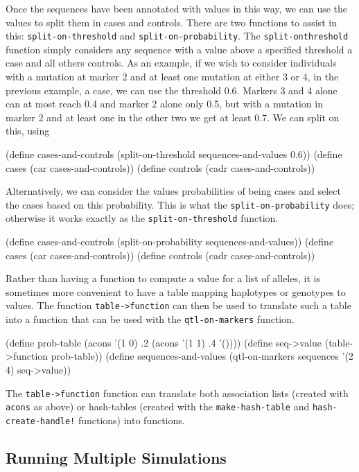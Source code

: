 \documentclass{manual}
\begin{document}
\begin{empfile}
Once the sequences have been annotated with values in this way, we can
use the values to split them in cases and controls.  There are two
functions to assist in this: \texttt{split-on-threshold} and
\texttt{split-on-probability}.  The \texttt{split-on\-threshold}
function simply considers any sequence with a value above a specified
threshold a case and all others controls.  As an example, if we wish
to consider individuals with a mutation at marker 2 and at least one
mutation at either 3 or 4, in the previous example, a case, we can use
the threshold 0.6.  Markers 3 and 4 alone can at most reach 0.4 and
marker 2 alone only 0.5, but with a mutation in marker 2 and at least
one in the other two we get at least 0.7.  We can split on this, using
\begin{code}
(define cases-and-controls
  (split-on-threshold sequences-and-values 0.6))
(define cases    (car cases-and-controls))
(define controls (cadr cases-and-controls))
\end{code}

Alternatively, we can consider the values probabilities of being cases
and select the cases based on this probability.  This is what the
\texttt{split-on-probability} does; otherwise it works exactly as the
\texttt{split-on-threshold} function.
\begin{code}
(define cases-and-controls (split-on-probability sequences-and-values))
(define cases    (car cases-and-controls))
(define controls (cadr cases-and-controls))
\end{code}

Rather than having a function to compute a value for a list of
alleles, it is sometimes more convenient to have a table mapping
haplotypes or genotypes to values.  The function
\texttt{table->function} can then be used to translate such a table
into a function that can be used with the \texttt{qtl-on-markers}
function.
\begin{code}
(define prob-table
  (acons '(1 0) .2
  (acons '(1 1) .4 
         '())))
(define seq->value (table->function prob-table))
(define sequences-and-values
  (qtl-on-markers sequences '(2 4) seq->value))
\end{code}

The \texttt{table->function} function can translate both association
lists (created with \texttt{acons} as above) or hash-tables (created
with the \texttt{make-hash-table} and \texttt{hash-create-handle!}
functions) into functions.


\subsection{Running Multiple Simulations}
\label{sec:runn-mult-simul}


\end{empfile}
\end{document}
